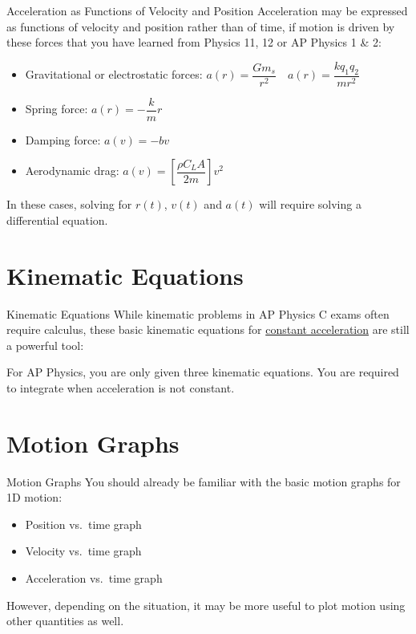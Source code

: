 \documentclass[12pt,compress,aspectratio=169,dvipsnames]{beamer}
\begin{document}
\begin{frame}{Acceleration as Functions of Velocity and Position}
  Acceleration may be expressed as functions of velocity and position rather
  than of time, if motion is driven by these forces that you have learned from
  Physics 11, 12 or AP Physics 1 \& 2:
  \begin{itemize}
  \item Gravitational or electrostatic forces:
    $a(r)=\dfrac{Gm_s}{r^2}\quad a(r)=\dfrac{kq_1q_2}{mr^2}$
  \item Spring force: $a(r)=-\dfrac kmr$
  \item Damping force: $a(v)=-bv$
  \item Aerodynamic drag:
    $a(v)=\left[\dfrac{\rho C_L A}{2m}\right] v^2$
  \end{itemize}

  \vspace{.1in}In these cases, solving for $r(t)$, $v(t)$ and $a(t)$ will
  require solving a differential equation. %
\end{frame}



\section{Kinematic Equations}

\begin{frame}{Kinematic Equations}
  While kinematic problems in AP Physics C exams often require calculus, these
  basic kinematic equations for \underline{constant acceleration} are still a
  powerful tool:

  \vspace{-.25in}{\large
    \begin{align*}
      x &= x_0+ v_0t + \frac12at^2\\
      v &= v_0+at\\
      v^2 &= v_0^2+ 2a(x-x_0)
    \end{align*}
  }

  For AP Physics, you are only given three kinematic equations. You are
  required to integrate when acceleration is not constant.
\end{frame}



\section{Motion Graphs}

\begin{frame}{Motion Graphs}
  You should already be familiar with the basic motion graphs for 1D motion:
  \begin{itemize}
  \item Position vs.\ time graph
  \item Velocity vs.\ time graph
  \item Acceleration vs.\ time graph
  \end{itemize}

  However, depending on the situation, it may be more useful to plot motion
  using other quantities as well.
\end{frame}
\end{document}
